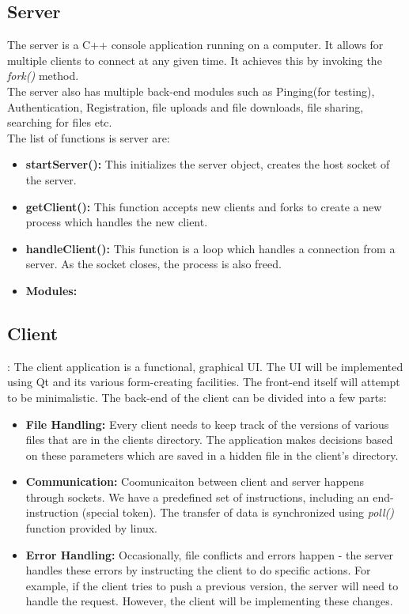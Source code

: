 \documentclass[]{article}
\begin{document}
\subsection{Server}
The server is a C++ console application running on a computer. It allows for multiple clients to connect at any given time. It achieves this by invoking the \textit{fork()} method. \\
The server also has multiple back-end modules such as Pinging(for testing), Authentication, Registration, file uploads and file downloads, file sharing, searching for files etc. \\
The list of functions is server are:
\begin{itemize}
\item \textbf{startServer():}  This initializes the server object, creates the host socket of the server. 
\item \textbf{getClient():}    This function accepts new clients and forks to create a new process which handles the new client.
\item \textbf{handleClient():} This function is a loop which handles a connection from a server. As the socket closes, the process is also freed.
\item \textbf{Modules:} %
\end{itemize}

\subsection{Client} :
The client application is a functional, graphical UI. The UI will be implemented using Qt and its various form-creating facilities. The front-end itself will attempt to be minimalistic.
The back-end of the client can be divided into a few parts:
\begin{itemize}
\item \textbf{File Handling:}
Every client needs to keep track of the versions of various files that are in the clients directory. The application makes decisions based on these parameters which are saved in a hidden file in the client's directory.
\item \textbf{Communication:}
Coomunicaiton between client and server happens through sockets. We have a predefined set of instructions, including an end-instruction (special token). The transfer of data is synchronized using \textit{poll()} function provided by linux.
\item \textbf{Error Handling:}
Occasionally, file conflicts and errors happen - the server handles these errors by instructing the client to do specific actions. For example, if the client tries to push a previous version, the server will need to handle the request. However, the client will be implementing these changes.
\end{itemize}
\end{document}

